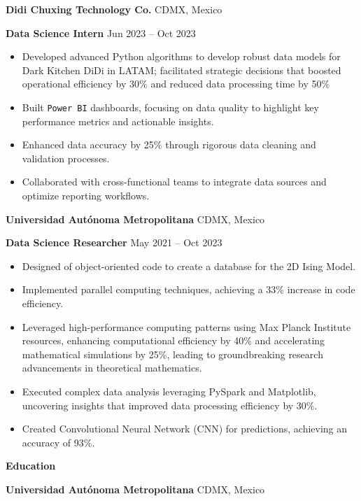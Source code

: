 \documentclass[6pt]{article}
\begin{document}
\vspace{12pt}

\textbf{Didi Chuxing Technology Co.} \hfill CDMX, Mexico

\textbf{Data Science Intern} \hfill Jun 2023 – Oct 2023
\begin{itemize}[noitemsep, topsep=0pt, partopsep=0pt, parsep=0pt]
    \item Developed advanced Python algorithms to develop robust data models for Dark Kitchen DiDi in LATAM; facilitated strategic decisions that boosted operational efficiency by 30\% and reduced data processing time by 50\%
    \item Built \texttt{Power BI} dashboards, focusing on data quality to highlight key performance metrics and actionable insights.
    \item Enhanced data accuracy by 25\% through rigorous data cleaning and validation processes.
    \item Collaborated with cross-functional teams to integrate data sources and optimize reporting workflows.
\end{itemize}

\vspace{12pt}

\textbf{Universidad Autónoma Metropolitana} \hfill CDMX, Mexico

\textbf{Data Science Researcher} \hfill May 2021 – Oct 2023
\begin{itemize}[noitemsep, topsep=0pt, partopsep=0pt, parsep=0pt]
    \item Designed of object-oriented code to create a database for the 2D Ising Model.
    \item Implemented parallel computing techniques, achieving a 33\% increase in code efficiency.
    \item Leveraged high-performance computing patterns using Max Planck Institute resources, enhancing computational efficiency by 40\% and accelerating mathematical simulations by 25\%, leading to groundbreaking research advancements in theoretical mathematics.
    \item Executed complex data analysis leveraging PySpark and Matplotlib, uncovering insights that improved data processing efficiency by 30\%.
    \item Created Convolutional Neural Network (CNN) for predictions, achieving an accuracy of 93\%.
\end{itemize}

\begin{center}
    \textbf{Education}
\end{center}
\textbf{Universidad Autónoma Metropolitana} \hfill CDMX, Mexico
\end{document}
